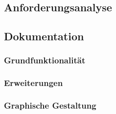 \documentclass[a4paper,
12pt,
oneside]
{article}
\begin{document}
	\subsection{Anforderungsanalyse}
	
	
	
	\subsection{Dokumentation}
	
	\subsubsection{Grundfunktionalität}
	
	\subsubsection{Erweiterungen}
	 
	\subsubsection{Graphische Gestaltung}
	\clearpage
	
	
	
\end{document}

